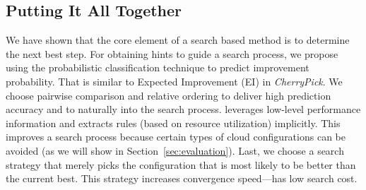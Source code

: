 \subsection{Putting It All Together}
We have shown that the core element of a search based method is to determine
the next best step.
For obtaining hints to guide a search process,
we propose using the probabilistic classification technique
to predict improvement probability.
That is similar to Expected Improvement (EI) in \emph{CherryPick}.
We choose pairwise comparison and relative ordering
to deliver high prediction accuracy and to naturally into the search process.
\scout leverages low-level performance information and
extracts rules (based on resource utilization) implicitly.
This improves a search process because certain types of cloud configurations
can be avoided (as we will show in Section~\ref{sec:evaluation}).
Last, we choose a search strategy that merely picks the configuration
that is most likely to be better than the current best.
This strategy increases convergence speed---has low search cost.
